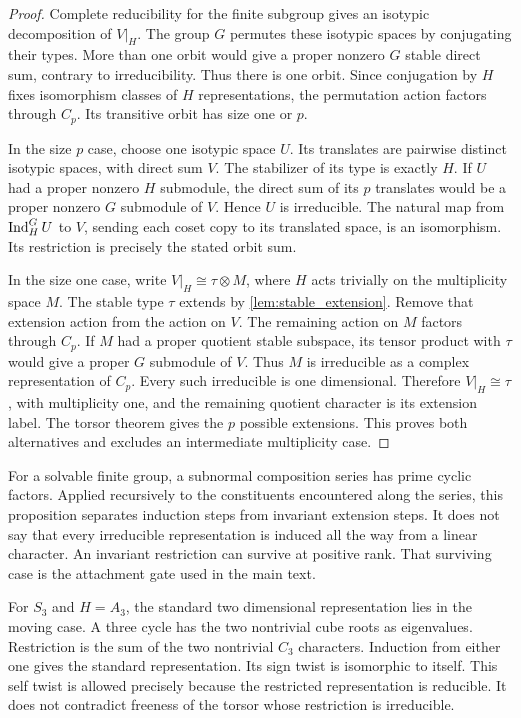 \begin{proof}
Complete reducibility for the finite subgroup gives an isotypic decomposition of \(V|_H\). The group \(G\) permutes these isotypic spaces by conjugating their types. More than one orbit would give a proper nonzero \(G\) stable direct sum, contrary to irreducibility. Thus there is one orbit. Since conjugation by \(H\) fixes isomorphism classes of \(H\) representations, the permutation action factors through \(C_p\). Its transitive orbit has size one or \(p\).

In the size \(p\) case, choose one isotypic space \(U\). Its translates are pairwise distinct isotypic spaces, with direct sum \(V\). The stabilizer of its type is exactly \(H\). If \(U\) had a proper nonzero \(H\) submodule, the direct sum of its \(p\) translates would be a proper nonzero \(G\) submodule of \(V\). Hence \(U\) is irreducible. The natural map from \(\operatorname{Ind}_H^G U\) to \(V\), sending each coset copy to its translated space, is an isomorphism. Its restriction is precisely the stated orbit sum.

In the size one case, write \(V|_H\cong\tau\otimes M\), where \(H\) acts trivially on the multiplicity space \(M\). The stable type \(\tau\) extends by \cref{lem:stable_extension}. Remove that extension action from the action on \(V\). The remaining action on \(M\) factors through \(C_p\). If \(M\) had a proper quotient stable subspace, its tensor product with \(\tau\) would give a proper \(G\) submodule of \(V\). Thus \(M\) is irreducible as a complex representation of \(C_p\). Every such irreducible is one dimensional. Therefore \(V|_H\cong\tau\), with multiplicity one, and the remaining quotient character is its extension label. The torsor theorem gives the \(p\) possible extensions. This proves both alternatives and excludes an intermediate multiplicity case.
\end{proof}

For a solvable finite group, a subnormal composition series has prime cyclic factors. Applied recursively to the constituents encountered along the series, this proposition separates induction steps from invariant extension steps. It does not say that every irreducible representation is induced all the way from a linear character. An invariant restriction can survive at positive rank. That surviving case is the attachment gate used in the main text.

For \(S_3\) and \(H=A_3\), the standard two dimensional representation lies in the moving case. A three cycle has the two nontrivial cube roots as eigenvalues. Restriction is the sum of the two nontrivial \(C_3\) characters. Induction from either one gives the standard representation. Its sign twist is isomorphic to itself. This self twist is allowed precisely because the restricted representation is reducible. It does not contradict freeness of the torsor whose restriction is irreducible.

